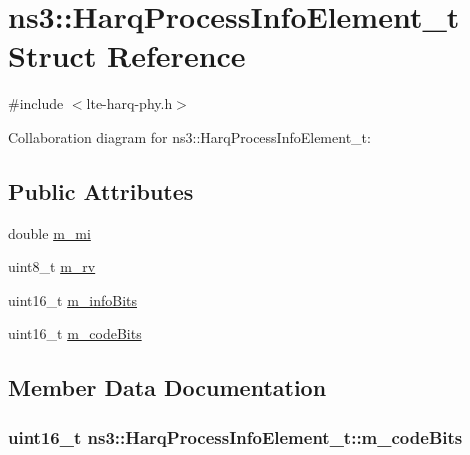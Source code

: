 \hypertarget{structns3_1_1HarqProcessInfoElement__t}{}\section{ns3\+:\+:Harq\+Process\+Info\+Element\+\_\+t Struct Reference}
\label{structns3_1_1HarqProcessInfoElement__t}


{\ttfamily \#include $<$lte-\/harq-\/phy.\+h$>$}



Collaboration diagram for ns3\+:\+:Harq\+Process\+Info\+Element\+\_\+t\+:
\subsection*{Public Attributes}
\begin{DoxyCompactItemize}
\item 
double \hyperlink{structns3_1_1HarqProcessInfoElement__t_ae2ebcd07f80854bedff98772eadfdc58}{m\+\_\+mi}
\item 
uint8\+\_\+t \hyperlink{structns3_1_1HarqProcessInfoElement__t_a9a0bd2f26b59ceb77e214f5246c09f47}{m\+\_\+rv}
\item 
uint16\+\_\+t \hyperlink{structns3_1_1HarqProcessInfoElement__t_a993fc3272b852d41fddf6e35aa6dcf18}{m\+\_\+info\+Bits}
\item 
uint16\+\_\+t \hyperlink{structns3_1_1HarqProcessInfoElement__t_a82a56dd467a0742129fda98abd13957d}{m\+\_\+code\+Bits}
\end{DoxyCompactItemize}


\subsection{Member Data Documentation}
\subsubsection[{\texorpdfstring{m\+\_\+code\+Bits}{m_codeBits}}]{\setlength{\rightskip}{0pt plus 5cm}uint16\+\_\+t ns3\+::\+Harq\+Process\+Info\+Element\+\_\+t\+::m\+\_\+code\+Bits}\hypertarget{structns3_1_1HarqProcessInfoElement__t_a82a56dd467a0742129fda98abd13957d}{}\label{structns3_1_1HarqProcessInfoElement__t_a82a56dd467a0742129fda98abd13957d}
